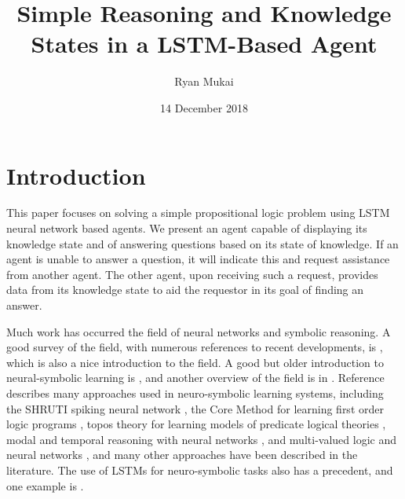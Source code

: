 \documentclass{article}
\title{Simple Reasoning and Knowledge States in a LSTM-Based Agent}
\author{Ryan Mukai}
\date{14 December 2018}
\begin{document}
\maketitle

\section{Introduction}

This paper focuses on solving a simple propositional logic
problem using LSTM neural network based agents.
We present an agent capable of displaying its knowledge
state and of answering questions based on its state of knowledge.  If an
agent is unable to answer a question, it will indicate
this and request assistance from another agent.  The other agent,
upon receiving such a request, provides data from its
knowledge state to aid the requestor in its goal of finding an answer.

Much work has occurred the field of neural networks and symbolic reasoning.
A good survey of the field, with numerous references to recent developments, is
\cite{DBLP:journals/corr/abs-1711-03902}, which is also a nice introduction to
the field.
A good but older introduction to neural-symbolic learning is \cite{neural_symbolic_2002},
and another overview of the field is in
\cite{bica2015_integrated_neural_symbolic}.
Reference
\cite{neural_symbolic_2007} describes many approaches used in neuro-symbolic
learning systems, including the SHRUTI spiking neural network
\cite{shruti_2007}, the Core Method for learning first order logic programs
\cite{core_method_2007}, topos theory for learning models of
predicate logical theories \cite{topos_theory_2007}, modal and temporal
reasoning with neural networks \cite{modal_temporal_2007}, and multi-valued
logic and neural networks \cite{multi_valued_logic_2007}, and many other
approaches have been described in the literature.  The use of LSTMs for
neuro-symbolic tasks also has a precedent,
and one example is \cite{captcha_2017}.
\end{document}

